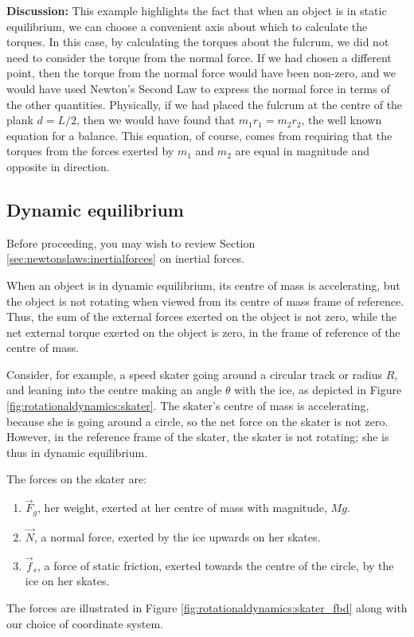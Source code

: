 \begin{example}
\textbf{Discussion: }This example highlights the fact that when an object is in static equilibrium, we can choose a convenient axis about which to calculate the torques. In this case, by calculating the torques about the fulcrum, we did not need to consider the torque from the normal force. If we had chosen a different point, then the torque from the normal force would have been non-zero, and we would have used Newton's Second Law to express the normal force in terms of the other quantities. Physically, if we had placed the fulcrum at the centre of the plank $d = L/2$, then we would have found that $m_1r_1 = m_2r_2$, the well known equation for a balance. This equation, of course, comes from requiring that the torques from the forces exerted by $m_1$ and $m_2$ are equal in magnitude and opposite in direction.
\end{example}

\subsection{Dynamic equilibrium}
\vspace{0.25cm}
\begin{review}
Before proceeding, you may wish to review Section \ref{sec:newtonslaws:inertialforces} on inertial forces.
\end{review}

When an object is in dynamic equilibrium, its centre of mass is accelerating, but the object is not rotating when viewed from its centre of mass frame of reference. Thus, the sum of the external forces exerted on the object is not zero, while the net external torque exerted on the object is zero, in the frame of reference of the centre of mass.


Consider, for example, a speed skater going around a circular track or radius $R$, and leaning into the centre making an angle $\theta$ with the ice, as depicted in Figure \ref{fig:rotationaldynamics:skater}. The skater's centre of mass is accelerating, because she is going around a circle, so the net force on the skater is not zero. However, in the reference frame of the skater, the skater is not rotating; she is thus in dynamic equilibrium.

The forces on the skater are:
\begin{enumerate}
\item $\vec F_g$, her weight, exerted at her centre of mass with magnitude, $Mg$.
\item $\vec N$, a normal force, exerted by the ice upwards on her skates.
\item $\vec f_s$, a force of static friction, exerted towards the centre of the circle, by the ice on her skates.
\end{enumerate}
The forces are illustrated in Figure \ref{fig:rotationaldynamics:skater_fbd} along with our choice of coordinate system.

